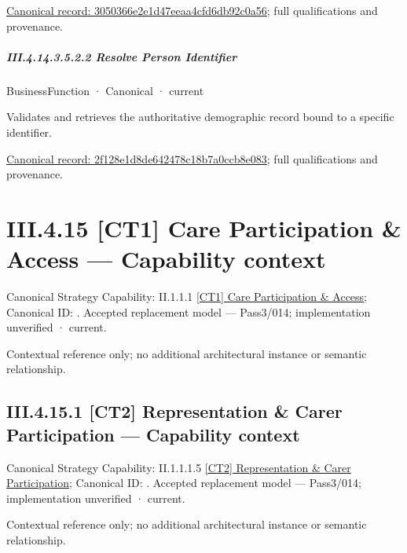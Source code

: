{\footnotesize \href{../../../../../../../../continuum/business/business-function/3050366e2e1d47eeaa4cfd6db92c0a56.md}{Canonical record: 3050366e2e1d47eeaa4cfd6db92c0a56}; full qualifications and provenance.}\par
\subparagraph*{III.4.14.3.5.2.2 Resolve Person Identifier}
\label{navigation:III.4.14.3.5.2.2}

\label{element:2f128e1d8de642478c18b7a0ccb8e083}
{\small BusinessFunction · Canonical · current}\par

Validates and retrieves the authoritative demographic record bound to a specific identifier.


{\footnotesize \href{../../../../../../../../continuum/business/business-function/2f128e1d8de642478c18b7a0ccb8e083.md}{Canonical record: 2f128e1d8de642478c18b7a0ccb8e083}; full qualifications and provenance.}\par
\section*{III.4.15 [CT1] Care Participation \& Access — Capability context}
\label{navigation:III.4.15}

{\small Canonical Strategy Capability: II.1.1.1 \hyperref[element:5b06afe075e44cc39236f628c5ada113]{[CT1] Care Participation \& Access}; Canonical ID: \texttt{}. Accepted replacement model — Pass3/014; implementation unverified · current.}\par
Contextual reference only; no additional architectural instance or semantic relationship.\par
\subsection*{III.4.15.1 [CT2] Representation \& Carer Participation — Capability context}
\label{navigation:III.4.15.1}

{\small Canonical Strategy Capability: II.1.1.1.5 \hyperref[element:0a8380fcfc2a4341927b409603a189f3]{[CT2] Representation \& Carer Participation}; Canonical ID: \texttt{}. Accepted replacement model — Pass3/014; implementation unverified · current.}\par
Contextual reference only; no additional architectural instance or semantic relationship.\par

